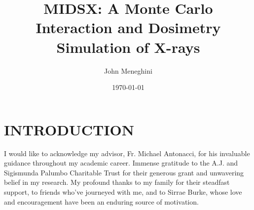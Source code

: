 \documentclass[%
 aip,
cp,  %
 amsmath,amssymb,%
reprint,%
]{revtex4-2}
\begin{document}
\title{MIDSX: A Monte Carlo Interaction and Dosimetry Simulation of X-rays}%

\author{John Meneghini} %

\date{\today} %

\begin{abstract}

\end{abstract}

\maketitle

\section{INTRODUCTION}


















\begin{acknowledgments}
    I would like to acknowledge my advisor, Fr. Michael Antonacci, for his invaluable guidance throughout my academic career. Immense gratitude to the A.J. and Sigismunda Palumbo Charitable Trust for their generous grant and unwavering belief in my research. My profound thanks to my family for their steadfast support, to friends who've journeyed with me, and to Sirrae Burke, whose love and encouragement have been an enduring source of motivation.
\end{acknowledgments}


\end{document}
